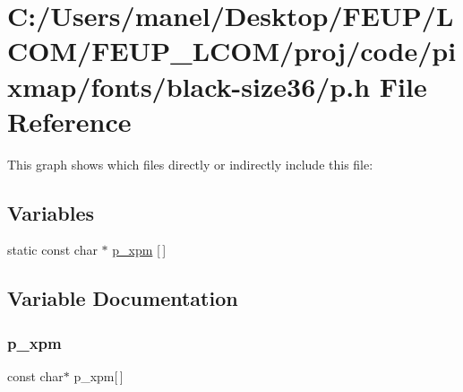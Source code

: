 \hypertarget{black-size36_2p_8h}{}\section{C\+:/\+Users/manel/\+Desktop/\+F\+E\+U\+P/\+L\+C\+O\+M/\+F\+E\+U\+P\+\_\+\+L\+C\+O\+M/proj/code/pixmap/fonts/black-\/size36/p.h File Reference}
\label{black-size36_2p_8h}
This graph shows which files directly or indirectly include this file\+:
\subsection*{Variables}
\begin{DoxyCompactItemize}
\item 
static const char $\ast$ \mbox{\hyperlink{black-size36_2p_8h_a16220b914ae79af0c6d6866b39dac46c}{p\+\_\+xpm}} \mbox{[}$\,$\mbox{]}
\end{DoxyCompactItemize}


\subsection{Variable Documentation}
\mbox{\label{black-size36_2p_8h_a16220b914ae79af0c6d6866b39dac46c}} 
\subsubsection{\texorpdfstring{p\_xpm}{p\_xpm}}
{\footnotesize\ttfamily const char$\ast$ p\+\_\+xpm\mbox{[}$\,$\mbox{]}\hspace{0.3cm}{\ttfamily [static]}}

